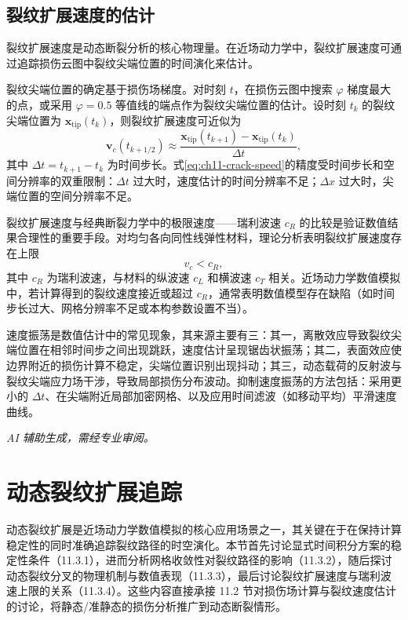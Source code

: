 \subsection{裂纹扩展速度的估计}\label{sec:ch11-crack-speed}

裂纹扩展速度是动态断裂分析的核心物理量。在近场动力学中，裂纹扩展速度可通过追踪损伤云图中裂纹尖端位置的时间演化来估计。

裂纹尖端位置的确定基于损伤场梯度。对时刻 $t$，在损伤云图中搜索 $\varphi$ 梯度最大的点，或采用 $\varphi=0.5$ 等值线的端点作为裂纹尖端位置的估计。设时刻 $t_k$ 的裂纹尖端位置为 $\mathbf{x}_{\mathrm{tip}}(t_k)$，则裂纹扩展速度可近似为
\begin{equation}
\mathbf{v}_c(t_{k+1/2})\approx\frac{\mathbf{x}_{\mathrm{tip}}(t_{k+1})-\mathbf{x}_{\mathrm{tip}}(t_k)}
{\Delta t},
\label{eq:ch11-crack-speed}
\end{equation}
其中 $\Delta t=t_{k+1}-t_k$ 为时间步长。式\eqref{eq:ch11-crack-speed}的精度受时间步长和空间分辨率的双重限制：$\Delta t$ 过大时，速度估计的时间分辨率不足；$\Delta x$ 过大时，尖端位置的空间分辨率不足。

裂纹扩展速度与经典断裂力学中的极限速度——瑞利波速 $c_R$ 的比较是验证数值结果合理性的重要手段。对均匀各向同性线弹性材料，理论分析表明裂纹扩展速度存在上限
\begin{equation}
v_c<c_R,
\label{eq:ch11-rayleigh-limit}
\end{equation}
其中 $c_R$ 为瑞利波速，与材料的纵波速 $c_L$ 和横波速 $c_T$ 相关。近场动力学数值模拟中，若计算得到的裂纹速度接近或超过 $c_R$，通常表明数值模型存在缺陷（如时间步长过大、网格分辨率不足或本构参数设置不当）。

速度振荡是数值估计中的常见现象，其来源主要有三：其一，离散效应导致裂纹尖端位置在相邻时间步之间出现跳跃，速度估计呈现锯齿状振荡；其二，表面效应使边界附近的损伤计算不稳定，尖端位置识别出现抖动；其三，动态载荷的反射波与裂纹尖端应力场干涉，导致局部损伤分布波动。抑制速度振荡的方法包括：采用更小的 $\Delta t$、在尖端附近局部加密网格、以及应用时间滤波（如移动平均）平滑速度曲线。

\emph{AI 辅助生成，需经专业审阅。}

\section{动态裂纹扩展追踪}\label{sec:ch11-dynamic-crack}

动态裂纹扩展是近场动力学数值模拟的核心应用场景之一，其关键在于在保持计算稳定性的同时准确追踪裂纹路径的时空演化。本节首先讨论显式时间积分方案的稳定性条件（11.3.1），进而分析网格收敛性对裂纹路径的影响（11.3.2），随后探讨动态裂纹分叉的物理机制与数值表现（11.3.3），最后讨论裂纹扩展速度与瑞利波速上限的关系（11.3.4）。这些内容直接承接 11.2 节对损伤场计算与裂纹速度估计的讨论，将静态/准静态的损伤分析推广到动态断裂情形。


